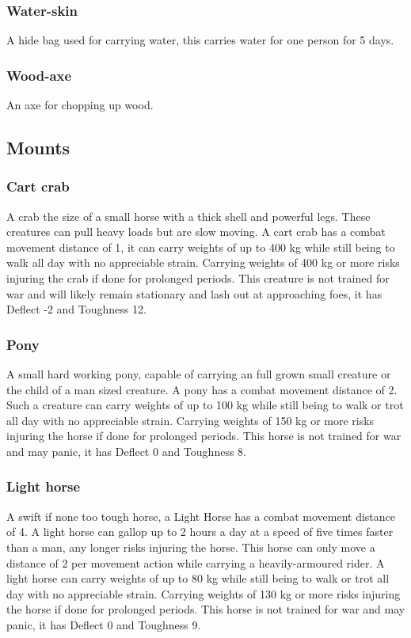 \documentclass[a4paper,11pt,oneside]{book}
\begin{document}
\subsubsection{Water-skin}
A hide bag used for carrying water, this carries water for one person for 5 days.

\subsubsection{Wood-axe}
An axe for chopping up wood.

\subsection{Mounts}

\subsubsection{Cart crab}
A crab the size of a small horse with a thick shell and powerful legs. These creatures can pull heavy loads but are slow moving. A cart crab has a combat movement distance of 1, it can carry weights of up to 400 kg while still being to walk all day with no appreciable strain. Carrying weights of 400 kg or more risks injuring the crab if done for prolonged periods. This creature is not trained for war and will likely remain stationary and lash out at approaching foes, it has Deflect -2 and Toughness 12.

\subsubsection{Pony}
A small hard working pony, capable of carrying an full grown small creature or the child of a man sized creature. A pony has a combat movement distance of 2. Such a creature can carry weights of up to 100 kg while still being to walk or trot all day with no appreciable strain. Carrying weights of 150 kg or more risks injuring the horse if done for prolonged periods. This horse is not trained for war and may panic, it has Deflect 0 and Toughness 8.

\subsubsection{Light horse}
A swift if none too tough horse, a Light Horse has a combat movement distance of 4. A light horse can gallop up to 2 hours a day at a speed of five times faster than a man, any longer risks injuring the horse. This horse can only move a distance of 2 per movement action while carrying a heavily-armoured rider. A light horse can carry weights of up to 80 kg while still being to walk or trot all day with no appreciable strain. Carrying weights of 130 kg or more risks injuring the horse if done for prolonged periods. This horse is not trained for war and may panic, it has Deflect 0 and Toughness 9.
\end{document}
